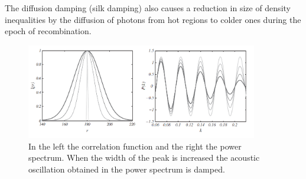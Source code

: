 The diffusion damping (silk damping)  also causes a reduction in size of density inequalities by the diffusion of photons from 
hot regions to colder ones during the epoch of recombination. 

\begin{figure}[htbp]
       \centering
               \includegraphics[width=0.9\textwidth]{Images/chapter2/width.png}
       \caption{\small In the left the correlation function and the right the power spectrum. When the width of the peak is increased
       the acoustic oscillation obtained in the power spectrum is damped.    }
       \label{peak}
 \end{figure}
